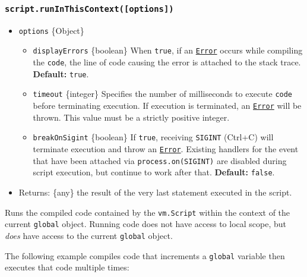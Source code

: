 \subsubsection{\texorpdfstring{\texttt{script.runInThisContext({[}options{]})}}{script.runInThisContext({[}options{]})}}\label{script.runinthiscontextoptions}

\begin{itemize}
\tightlist
\item
  \texttt{options} \{Object\}

  \begin{itemize}
  \tightlist
  \item
    \texttt{displayErrors} \{boolean\} When \texttt{true}, if an
    \href{errors.md\#class-error}{\texttt{Error}} occurs while compiling
    the \texttt{code}, the line of code causing the error is attached to
    the stack trace. \textbf{Default:} \texttt{true}.
  \item
    \texttt{timeout} \{integer\} Specifies the number of milliseconds to
    execute \texttt{code} before terminating execution. If execution is
    terminated, an \href{errors.md\#class-error}{\texttt{Error}} will be
    thrown. This value must be a strictly positive integer.
  \item
    \texttt{breakOnSigint} \{boolean\} If \texttt{true}, receiving
    \texttt{SIGINT} (Ctrl+C) will terminate execution and throw an
    \href{errors.md\#class-error}{\texttt{Error}}. Existing handlers for
    the event that have been attached via
    \texttt{process.on(\textquotesingle{}SIGINT\textquotesingle{})} are
    disabled during script execution, but continue to work after that.
    \textbf{Default:} \texttt{false}.
  \end{itemize}
\item
  Returns: \{any\} the result of the very last statement executed in the
  script.
\end{itemize}

Runs the compiled code contained by the \texttt{vm.Script} within the
context of the current \texttt{global} object. Running code does not
have access to local scope, but \emph{does} have access to the current
\texttt{global} object.

The following example compiles code that increments a \texttt{global}
variable then executes that code multiple times:

